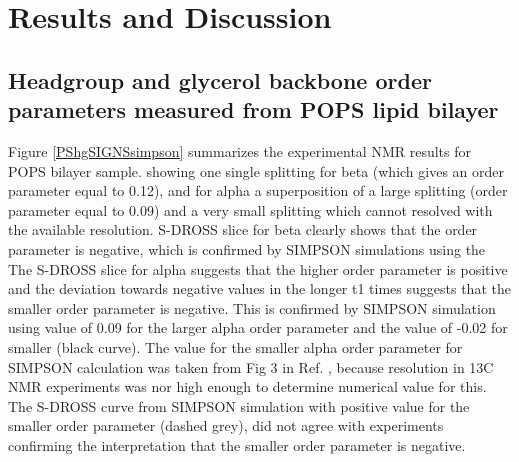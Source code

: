 \documentclass[aps,prl,superscriptaddress,twocolumn]{revtex4}
\begin{document}
\section{Results and Discussion}

\subsection{Headgroup and glycerol backbone order parameters measured from POPS lipid bilayer}

Figure \ref{PShgSIGNSsimpson} summarizes the experimental NMR results for POPS bilayer sample.
showing one single
    splitting for beta (which gives an order parameter equal to 0.12), and for alpha a superposition
    of a large splitting (order parameter equal to 0.09) and a very small splitting which cannot
    resolved with the available resolution.
    S-DROSS slice for beta clearly shows that the order parameter is negative,
    which is confirmed by SIMPSON simulations using the 
    The S-DROSS slice for alpha suggests that the higher order parameter is positive
    and the deviation towards negative values in the longer t1 times suggests
    that the smaller order parameter is negative.
    This is confirmed by SIMPSON simulation using value of 0.09
    for the larger alpha order parameter and the value of -0.02 for
    smaller (black curve). The value for the smaller
    alpha order parameter for SIMPSON calculation was taken from Fig 3 in Ref. ,
    because resolution in 13C NMR experiments was nor high enough to determine
    numerical value for this. The S-DROSS curve from SIMPSON simulation with positive value
    for the smaller order parameter (dashed grey), did not agree with experiments 
    confirming the interpretation that the smaller order parameter is negative.
\end{document}
